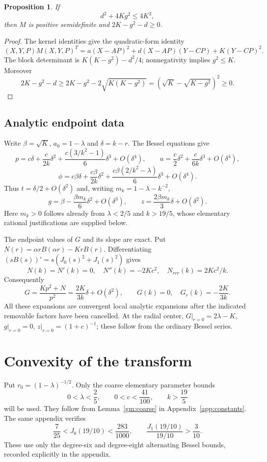 \documentclass[11pt]{article}
\newtheorem{proposition}[theorem]{Proposition}
\theoremstyle{remark}
\begin{document}
\begin{proposition}\label{prop:reduction}
If
\begin{equation}\label{remaining-positivity}
 d^2+4Kg^2\le4K^2,
\end{equation}
then $M$ is positive semidefinite and $2K-g^2-d\ge0$.
\end{proposition}
\begin{proof}
The kernel identities give the quadratic-form identity
\[
 (X,Y,P)M(X,Y,P)^T
 =a(X-AP)^2+d(X-AP)(Y-CP)+K(Y-CP)^2.
\]
The block determinant is $K(K-g^2)-d^2/4$; nonnegativity implies
$g^2\le K$. Moreover
\[
 2K-g^2-d\ge2K-g^2-2\sqrt{K(K-g^2)}
            =\left(\sqrt K-\sqrt{K-g^2}\right)^2\ge0.
\]
\end{proof}

\subsection{Analytic endpoint data}\label{sec:endpoints}
Write $\beta=\sqrt K$, $a_0=1-\lambda$ and $\delta=k-r$.
The Bessel equations give
\[
 p=c\delta+\frac{c}{2k}\delta^2+
       \frac{c(3/k^2-1)}6\delta^3+O(\delta^4),\qquad
 u=\frac c2\delta^2+\frac{c}{6k}\delta^3+O(\delta^4),
\]
\[
 \phi=c\beta\delta+\frac{c\beta}{2k}\delta^2+
       \frac{c\beta(2/k^2-\lambda)}6\delta^3+O(\delta^4).
\]
Thus $t=\delta/2+O(\delta^2)$ and, writing $m_k=1-\lambda-k^{-2}$,
\[
 g=\beta-\frac{\beta m_k}{6}\delta^2+O(\delta^3),\qquad
 z=\frac{2\beta m_k}{3}\delta+O(\delta^2).
\]
Here $m_k>0$ follows already from $\lambda<2/5$ and $k>19/5$,
whose elementary rational justifications are supplied below.

The endpoint values of $G$ and its slope are exact. Put
$N(r)=\alpha rB(\alpha r)-KrB(r)$. Differentiating
$(sB(s))'=s(J_0(s)^2+J_1(s)^2)$ gives
\[
 N(k)=N'(k)=0,\quad N''(k)=-2Kc^2,
 \quad N_{rrr}(k)=2Kc^2/k.
\]
Consequently
\[
 G=\frac{Kp^2+N}{p^2}=\frac{2K}{3k}\delta+O(\delta^2),
 \qquad G(k)=0,\quad G_r(k)=-\frac{2K}{3k}.
\]
All these expansions are convergent local analytic expansions after
the indicated removable factors have been cancelled. At the radial center,
$G|_{r=0}=2\lambda-K$, $g|_{r=0}=0$, $z|_{r=0}=(1+c)^{-1}$; these follow
from the ordinary Bessel series.
\section{Convexity of the transform}\label{cv:sec:convexity}
Put $r_0=(1-\lambda)^{-1/2}$. Only the coarse elementary parameter bounds
\begin{equation}
 0<\lambda<\frac25,\qquad 0<c<\frac{41}{100},\qquad k>\frac{19}5
\end{equation}
will be used. They follow from Lemma~\ref{gm:coarse} in
Appendix~\ref{app:constants}. The same appendix verifies
\begin{equation}\label{cv:nineteen}
 \frac7{25}<J_0(19/10)<\frac{283}{1000},\qquad
 \frac{J_1(19/10)}{19/10}>\frac3{10}.
\end{equation}
These use only the degree-six and degree-eight alternating
Bessel bounds, recorded explicitly in the appendix.
\end{document}
